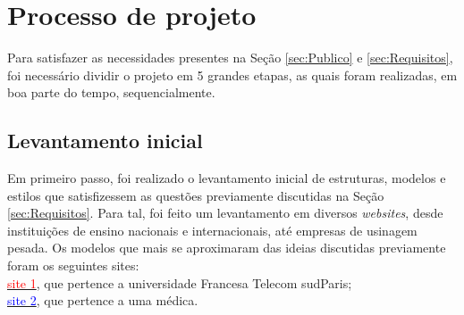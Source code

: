 \vspace{5mm}
\section{Processo de projeto}
\label{sec:processo}


Para satisfazer as necessidades presentes na Seção \ref{sec:Publico} e \ref{sec:Requisitos}, foi necessário dividir o projeto em 5  grandes etapas, as quais foram realizadas, em boa parte do tempo, sequencialmente.
\vspace{5mm}
\subsection{Levantamento inicial}
Em primeiro passo, foi realizado o levantamento inicial de estruturas, modelos e estilos que satisfizessem as questões previamente discutidas na Seção \ref{sec:Requisitos}. Para tal, foi feito um levantamento em diversos \textit{websites}, desde instituições de ensino nacionais e internacionais, até empresas de usinagem pesada. Os modelos que mais se aproximaram das ideias discutidas previamente foram os seguintes sites:\\
\href{https://www.telecom-sudparis.eu/en/}{\textcolor{red}{site 1}}, que pertence a universidade Francesa Telecom sudParis;\\
\href{https://nupem.com.br/especialidades/medicina-estetica-2/}{\textcolor{blue}{site 2}}, que pertence a uma médica. 

\vspace{5mm}
